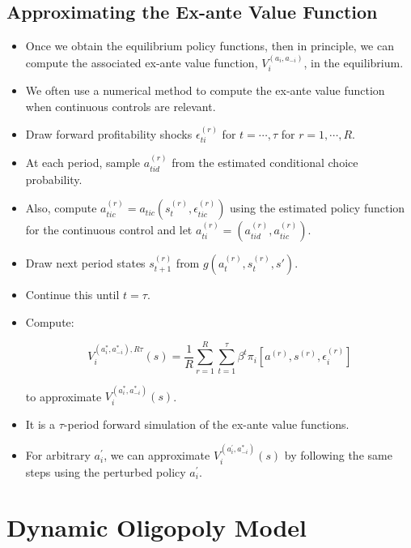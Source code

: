 \documentclass[]{book}
\providecommand{\tightlist}{%
  \setlength{\itemsep}{0pt}\setlength{\parskip}{0pt}}
\begin{document}
\subsection{Approximating the Ex-ante Value
Function}\label{approximating-the-ex-ante-value-function}

\begin{itemize}
\tightlist
\item
  Once we obtain the equilibrium policy functions, then in principle, we
  can compute the associated ex-ante value function,
  \(V_i^{(a_i, a_{-i})}\), in the equilibrium.
\item
  We often use a numerical method to compute the ex-ante value function
  when continuous controls are relevant.
\item
  Draw forward profitability shocks \(\epsilon_{ti}^{(r)}\) for
  \(t = \cdots, \tau\) for \(r = 1, \cdots, R\).
\item
  At each period, sample \(a_{tid}^{(r)}\) from the estimated
  conditional choice probability.
\item
  Also, compute
  \(a_{tic}^{(r)} = a_{tic}(s_t^{(r)}, \epsilon_{tic}^{(r)})\) using the
  estimated policy function for the continuous control and let
  \(a_{ti}^{(r)} = (a_{tid}^{(r)}, a_{tic}^{(r)})\).
\item
  Draw next period states \(s_{t + 1}^{(r)}\) from
  \(g(a_{t}^{(r)}, s_t^{(r)}, s')\).
\item
  Continue this until \(t = \tau\).
\item
  Compute:

  \begin{equation}
  V_i^{(a_i^*, a_{-i}^*), R\tau}(s) = \frac{1}{R}\sum_{r = 1}^R \sum_{t = 1}^\tau \beta^t \pi_i[a^{(r)}, s^{(r)}, \epsilon_i^{(r)}]
  \end{equation}

  to approximate \(V_i^{(a_i^*, a_{-i}^*)}(s)\).
\item
  It is a \(\tau\)-period forward simulation of the ex-ante value
  functions.
\item
  For arbitrary \(a_i^{\prime}\), we can approximate
  \(V_i^{(a_i^{\prime}, a_{-i}^*)}(s)\) by following the same steps
  using the perturbed policy \(a_i^{\prime}\).
\end{itemize}

\section{Dynamic Oligopoly Model}\label{dynamic-oligopoly-model}
\end{document}
